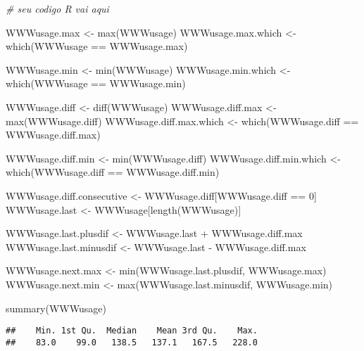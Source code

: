 \documentclass[
]{article}
\newenvironment{Shaded}{\begin{snugshade}}{\end{snugshade}}
\newcommand{\CommentTok}[1]{\textcolor[rgb]{0.56,0.35,0.01}{\textit{#1}}}
\newcommand{\DecValTok}[1]{\textcolor[rgb]{0.00,0.00,0.81}{#1}}
\newcommand{\FunctionTok}[1]{\textcolor[rgb]{0.00,0.00,0.00}{#1}}
\newcommand{\NormalTok}[1]{#1}
\newcommand{\OtherTok}[1]{\textcolor[rgb]{0.56,0.35,0.01}{#1}}
\newcommand{\SpecialCharTok}[1]{\textcolor[rgb]{0.00,0.00,0.00}{#1}}
\begin{document}
\begin{Shaded}
\begin{Highlighting}[]
\CommentTok{\# seu codigo R vai aqui}

\NormalTok{WWWusage.max }\OtherTok{\textless{}{-}} \FunctionTok{max}\NormalTok{(WWWusage)}
\NormalTok{WWWusage.max.which }\OtherTok{\textless{}{-}} \FunctionTok{which}\NormalTok{(WWWusage }\SpecialCharTok{==}\NormalTok{ WWWusage.max)}

\NormalTok{WWWusage.min }\OtherTok{\textless{}{-}} \FunctionTok{min}\NormalTok{(WWWusage)}
\NormalTok{WWWusage.min.which }\OtherTok{\textless{}{-}} \FunctionTok{which}\NormalTok{(WWWusage }\SpecialCharTok{==}\NormalTok{ WWWusage.min)}

\NormalTok{WWWusage.diff }\OtherTok{\textless{}{-}} \FunctionTok{diff}\NormalTok{(WWWusage)}
\NormalTok{WWWusage.diff.max }\OtherTok{\textless{}{-}} \FunctionTok{max}\NormalTok{(WWWusage.diff)}
\NormalTok{WWWusage.diff.max.which }\OtherTok{\textless{}{-}} \FunctionTok{which}\NormalTok{(WWWusage.diff }\SpecialCharTok{==}\NormalTok{ WWWusage.diff.max)}

\NormalTok{WWWusage.diff.min }\OtherTok{\textless{}{-}} \FunctionTok{min}\NormalTok{(WWWusage.diff)}
\NormalTok{WWWusage.diff.min.which }\OtherTok{\textless{}{-}} \FunctionTok{which}\NormalTok{(WWWusage.diff }\SpecialCharTok{==}\NormalTok{ WWWusage.diff.min)}

\NormalTok{WWWusage.diff.consecutive }\OtherTok{\textless{}{-}}\NormalTok{ WWWusage.diff[WWWusage.diff }\SpecialCharTok{==} \DecValTok{0}\NormalTok{]}
\NormalTok{WWWusage.last }\OtherTok{\textless{}{-}}\NormalTok{ WWWusage[}\FunctionTok{length}\NormalTok{(WWWusage)]}
  
\NormalTok{WWWusage.last.plusdif }\OtherTok{\textless{}{-}}\NormalTok{ WWWusage.last }\SpecialCharTok{+}\NormalTok{ WWWusage.diff.max}
\NormalTok{WWWusage.last.minusdif }\OtherTok{\textless{}{-}}\NormalTok{ WWWusage.last }\SpecialCharTok{{-}}\NormalTok{ WWWusage.diff.max}

\NormalTok{WWWusage.next.max }\OtherTok{\textless{}{-}} \FunctionTok{min}\NormalTok{(WWWusage.last.plusdif, WWWusage.max)}
\NormalTok{WWWusage.next.min }\OtherTok{\textless{}{-}} \FunctionTok{max}\NormalTok{(WWWusage.last.minusdif, WWWusage.min)}

\FunctionTok{summary}\NormalTok{(WWWusage)}
\end{Highlighting}
\end{Shaded}

\begin{verbatim}
##    Min. 1st Qu.  Median    Mean 3rd Qu.    Max. 
##    83.0    99.0   138.5   137.1   167.5   228.0
\end{verbatim}
\end{document}
